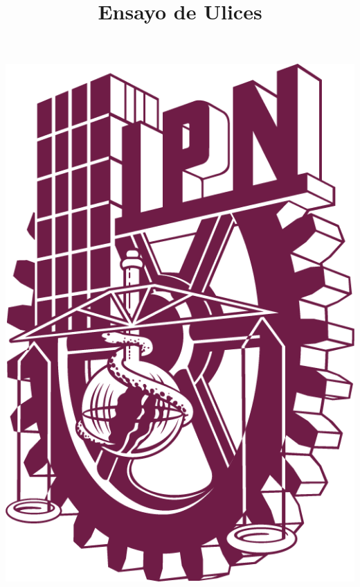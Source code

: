 	
\title{Ensayo de Ulices}

\thispagestyle{empty} %

\begin{center}
\newcommand{\HRule}{\rule{\linewidth}{1mm}}

\begin{minipage}{0.48\textwidth}
	\begin{flushleft}
		\includegraphics[scale = 0.125]{images/LOGO POLI PANTONE 222 C.png}
	\end{flushleft}
\end{minipage}

\end{center}
